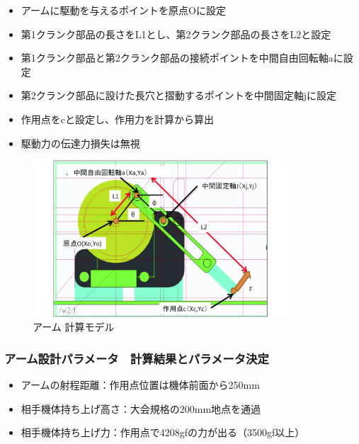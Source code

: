 \begin{itemize}
\tightlist
\item
  アームに駆動を与えるポイントを原点Oに設定
\item
  第1クランク部品の長さをL1とし、第2クランク部品の長さをL2と設定
\item
  第1クランク部品と第2クランク部品の接続ポイントを中間自由回転軸aに設定
\item
  第2クランク部品に設けた長穴と摺動するポイントを中間固定軸jに設定
\item
  作用点をcと設定し、作用力を計算から算出
\item
  駆動力の伝達力損失は無視
\end{itemize}

\begin{figure}[htbp]
\centering
\includegraphics[width=270pt]{fig/fig05_cmyk.jpg}
\caption{アーム 計算モデル}
\label{fig05}
\end{figure}

\clearpage

\subsubsection{アーム設計パラメータ　計算結果とパラメータ決定}\label{ux30a2ux30fcux30e0ux8a2dux8a08ux30d1ux30e9ux30e1ux30fcux30bfux8a08ux7b97ux7d50ux679cux3068ux30d1ux30e9ux30e1ux30fcux30bfux6c7aux5b9a}

\begin{itemize}
\tightlist
\item
  アームの射程距離：作用点位置は機体前面から250mm
\item
  相手機体持ち上げ高さ：大会規格の200mm地点を通過
\item
  相手機体持ち上げ力：作用点で4208gfの力が出る（3500gf以上）
\end{itemize}

